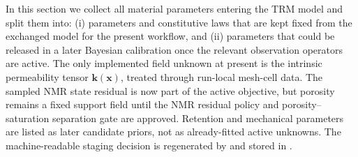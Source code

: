 \documentclass[10pt,a4paper]{article}
\newcommand{\kperm}{\bm{k}}
\begin{document}
In this section we collect all material parameters entering the TRM model and split
them into: (i) parameters and constitutive laws that are kept fixed from the exchanged
model for the present workflow, and (ii) parameters that could be released in a later
Bayesian calibration once the relevant observation operators are active.  The only
implemented field unknown at present is the intrinsic permeability tensor
\(\kperm(\bm x)\), treated through run-local mesh-cell data.  The sampled NMR state
residual is now part of the active objective, but porosity remains a fixed support
field until the NMR residual policy and porosity--saturation separation gate are
approved.  Retention and mechanical parameters are listed as later candidate priors,
not as already-fitted active unknowns.  The machine-readable staging decision is regenerated by
 and stored
in .
\end{document}
